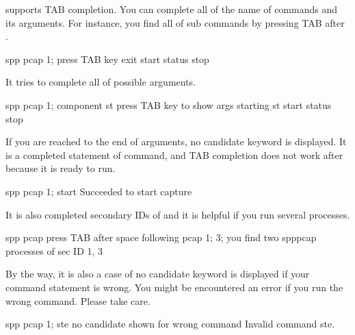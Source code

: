 \documentclass[a4paper,11pt,openany,oneside,english]{sphinxmanual}
\begin{document}
 supports TAB completion. You can complete all of the name
of commands and its arguments. For instance, you find all of sub commands
by pressing TAB after .

\begin{sphinxVerbatim}[commandchars=\\\{\},formatcom=\footnotesize]
spp \PYGZgt{} pcap 1;  \PYGZsh{} press TAB key
exit  start      status        stop
\end{sphinxVerbatim}

It tries to complete all of possible arguments.

\begin{sphinxVerbatim}[commandchars=\\\{\},formatcom=\footnotesize]
spp \PYGZgt{} pcap 1; component st  \PYGZsh{} press TAB key to show args starting \PYGZsq{}st\PYGZsq{}
start  status  stop
\end{sphinxVerbatim}

If you are reached to the end of arguments, no candidate keyword is displayed.
It is a completed statement of  command, and TAB
completion does not work after  because it is ready to run.

\begin{sphinxVerbatim}[commandchars=\\\{\},formatcom=\footnotesize]
spp \PYGZgt{} pcap 1; start
Succeeded to start capture
\end{sphinxVerbatim}

It is also completed secondary IDs of  and it is helpful if you
run several  processes.

\begin{sphinxVerbatim}[commandchars=\\\{\},formatcom=\footnotesize]
spp \PYGZgt{} pcap  \PYGZsh{} press TAB after space following \PYGZsq{}pcap\PYGZsq{}
1;  3;    \PYGZsh{} you find two spp\PYGZus{}pcap processes of sec ID 1, 3
\end{sphinxVerbatim}

By the way, it is also a case of no candidate keyword is displayed if your
command statement is wrong. You might be encountered an error if you run the
wrong command. Please take care.

\begin{sphinxVerbatim}[commandchars=\\\{\},formatcom=\footnotesize]
spp \PYGZgt{} pcap 1; ste  \PYGZsh{} no candidate shown for wrong command
Invalid command \PYGZdq{}ste\PYGZdq{}.
\end{sphinxVerbatim}
\end{document}
